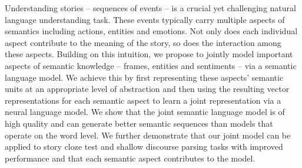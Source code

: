 Understanding stories -- sequences of events -- is a crucial yet challenging natural language understanding task. These events typically carry multiple aspects of semantics including actions, entities and emotions. Not only does each individual aspect contribute to the meaning of the story, so does the interaction among these aspects. Building on this intuition, we propose to jointly model important aspects of semantic knowledge -- frames, entities and sentiments -- via a semantic language model. We achieve this by first representing these aspects' semantic units at an appropriate level of abstraction and then using the resulting vector representations for each semantic aspect to learn a joint representation via a neural language model. We show that the joint semantic language model is of high quality and can generate better semantic sequences than models that operate on the word level. We further demonstrate that our joint model can be applied to story cloze test and shallow discourse parsing tasks with improved performance and that each semantic aspect contributes to the model.
